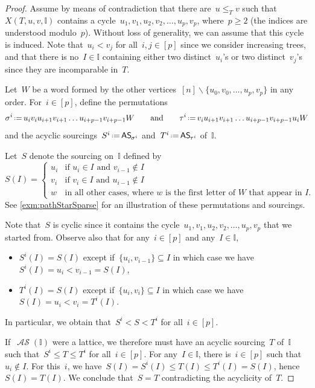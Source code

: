 \documentclass{amsart}
\theoremstyle{definition}
\newcommand{\ssm}{\smallsetminus} %
\newcommand{\eqdef}{\mbox{\,\raisebox{0.2ex}{\scriptsize\ensuremath{\mathrm:}}\ensuremath{=}\,}} %
\newcommand{\mymap}[2]{\mathsf{#1}_{\hspace{-.7pt}#2}}
\DeclareMathOperator{\ASour}{\mathcal{AS}}  %
\newcommand{\asour}[1]{\mymap{AS}{#1}}  %
\newcommand{\II}{\mathbb I} %
\begin{document}
\begin{proof}
Assume by means of contradiction that there are~$u \le_T v$ such that~$X(T,u,v,\II)$ contains a cycle~$u_1, v_1, u_2, v_2, \dots, u_p, v_p$, where~$p \ge 2$ (the indices are understood modulo~$p$).
Without loss of generality, we can assume that this cycle is induced.
Note that~$u_i < v_j$ for all~$i,j \in [p]$ since we consider increasing trees, and that there is no~$I \in \II$ containing either two distinct~$u_i$'s or two distinct~$v_j$'s since they are incomparable in~$T$.

Let~$W$ be a word formed by the other vertices~$[n] \ssm \{u_0, v_0, \dots, u_p, v_p\}$ in any order.
For~$i \in [p]$, define the permutations
\[
\sigma^i \eqdef u_i v_i u_{i+1} v_{i+1} \dots u_{i+p-1} v_{i+p-1} W
\qquad\text{and}\qquad
\tau^i \eqdef v_i u_{i+1} v_{i+1} \dots u_{i+p-1} v_{i+p-1} u_i W
\]
and the acyclic sourcings~$S^i \eqdef \asour{\sigma^i}$ and~$T^i \eqdef \asour{\tau^i}$ of~$\II$.

Let~$S$ denote the sourcing on~$\II$ defined by
\[
S(I) = 
\begin{cases}
	u_i & \text{if~$u_i \in I$ and~$v_{i-1} \notin I$} \\
	v_i & \text{if~$v_i \in I$ and~$u_{i-1} \notin I$} \\
	w & \text{in all other cases, where~$w$ is the first letter of~$W$ that appear in~$I$}.
\end{cases}
\]
See \cref{exm:pathStarSparse} for an illustration of these permutations and sourcings.

Note that~$S$ is cyclic since it contains the cycle~$u_1, v_1, u_2, v_2, \dots, u_p, v_p$ that we started from.
Observe also that for any~$i \in [p]$ and any~$I \in \II$,
\begin{itemize}
\item $S^i(I) = S(I)$ except if~$\{u_i, v_{i-1}\} \subseteq I$ in which case we have~$S^i(I) = u_i < v_{i-1} = S(I)$,
\item $T^i(I) = S(I)$ except if~$\{u_i, v_i\} \subseteq I$ in which case we have~$S(I) = u_i < v_i = T^i(I)$.
\end{itemize}
In particular, we obtain that~$S^i < S < T^i$ for all~$i \in [p]$.

If~$\ASour(\II)$ were a lattice, we therefore must have an acyclic sourcing~$T$ of~$\II$ such that~$S^i \le T \le T^i$ for all~$i \in [p]$.
For any~$I \in \II$, there is~$i \in [p]$ such that~$u_i \notin I$.
For this~$i$, we have~$S(I) = S^i(I) \le T(I) \le T^i(I) = S(I)$, hence~$S(I) = T(I)$.
We conclude that~$S = T$ contradicting the acyclicity of~$T$.
\end{proof}
\end{document}
